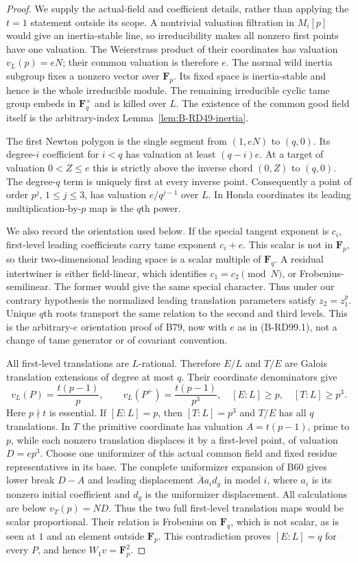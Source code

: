 \begin{proof}
We supply the actual-field and coefficient details, rather than
applying the $t=1$ statement outside its scope. A nontrivial
valuation filtration in $M_i[p]$ would give an inertia-stable
line, so irreducibility makes all nonzero first points have
one valuation. The Weierstrass product of their coordinates
has valuation $v_L(p)=eN$; their common valuation is therefore
$e$. The normal wild inertia subgroup fixes a nonzero vector
over $\mathbf F_p$. Its fixed space is inertia-stable and hence
is the whole irreducible module. The remaining irreducible
cyclic tame group embeds in $\mathbf F_q^\times$ and is killed
over $L$. The existence of the common good field itself is the
arbitrary-index Lemma~\ref{lem:B-RD49-inertia}.

The first Newton polygon is the single segment from $(1,eN)$
to $(q,0)$. Its degree-$i$ coefficient for $i<q$ has valuation
at least $(q-i)e$. At a target of valuation $0<Z\le e$ this
is strictly above the inverse chord $(0,Z)$ to $(q,0)$.
The degree-$q$ term is uniquely first at every inverse point.
Consequently a point of order $p^j$, $1\le j\le3$, has
valuation $e/q^{j-1}$ over $L$. In Honda coordinates its
leading multiplication-by-$p$ map is the $q$th power.

We also record the orientation used below. If the special
tangent exponent is $c_i$, first-level leading coefficients
carry tame exponent $c_i+e$. This scalar is not in $\mathbf F_p$,
so their two-dimensional leading space is a scalar multiple
of $\mathbf F_q$. A residual intertwiner is either field-linear,
which identifies $c_1=c_2\pmod N$, or Frobenius-semilinear.
The former would give the same special character. Thus under
our contrary hypothesis the normalized leading translation
parameters satisfy $z_2=z_1^p$. Unique $q$th roots transport
the same relation to the second and third levels. This is the
arbitrary-$e$ orientation proof of B79, now with $e$ as in
(B-RD99.1), not a change of tame generator or of covariant
convention.

All first-level translations are $L$-rational. Therefore
$E/L$ and $T/E$ are Galois translation extensions of degree
at most $q$. Their coordinate denominators give
\[
 v_L(P)=\frac{t(p-1)}p,\qquad
 v_L(P^+)=\frac{t(p-1)}{p^3},
 \quad [E:L]\ge p,\quad[T:L]\ge p^3.                 \tag{B-RD99.5}
\]
Here $p\nmid t$ is essential. If $[E:L]=p$, then $[T:L]=p^3$
and $T/E$ has all $q$ translations. In $T$ the primitive
coordinate has valuation $A=t(p-1)$, prime to $p$, while
each nonzero translation displaces it by a first-level point,
of valuation $D=ep^3$. Choose one uniformizer of this actual
common field and fixed residue representatives in its base.
The complete uniformizer expansion of B60 gives lower break
$D-A$ and leading displacement $\overline A a_i d_g$ in
model $i$, where $a_i$ is its nonzero initial coefficient and
$d_g$ is the uniformizer displacement. All calculations are
below $v_T(p)=ND$. Thus the two full first-level translation
maps would be scalar proportional. Their relation is Frobenius
on $\mathbf F_q$, which is not scalar, as is seen at $1$ and
an element outside $\mathbf F_p$. This contradiction proves
$[E:L]=q$ for every $P$, and hence $W_1v=\mathbf F_p^2$.


\end{proof}
